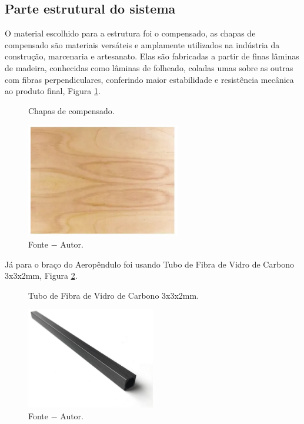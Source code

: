 \subsection{ Parte estrutural do sistema}

 O material escolhido para a estrutura foi o compensado, as chapas de compensado são materiais versáteis e amplamente utilizados na indústria da construção, marcenaria e artesanato. Elas são fabricadas a partir de finas lâminas de madeira, conhecidas como lâminas de folheado, coladas umas sobre as outras com fibras perpendiculares, conferindo maior estabilidade e resistência mecânica ao produto final, Figura \ref{fig3:image_02}.

\begin{figure}[!h]
	\centering
	\caption{Chapas de compensado.}
	\includegraphics[width=0.6\textwidth]{Capitulos/3_simulacao_e_prototipo/3_figuras/compensado.eps}
	\caption*{Fonte $-$ Autor.}
	\label{fig3:image_02}
\end{figure}



 Já para o braço do Aeropêndulo foi usando Tubo de Fibra de Vidro de Carbono 3x3x2mm, Figura \ref{fig3:image_03}.

\begin{figure}[!h]
	\centering
	\caption{Tubo de Fibra de Vidro de Carbono 3x3x2mm.}
	\includegraphics[width=0.5\textwidth]{Capitulos/3_simulacao_e_prototipo/3_figuras/carbono2x2mm.eps}
	\caption*{Fonte $-$ Autor.}
	\label{fig3:image_03}
\end{figure}


